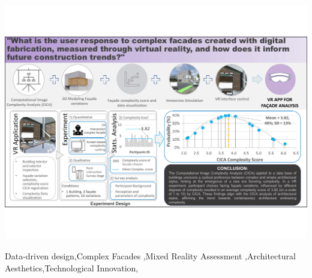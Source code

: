 \documentclass[final,5p,times]{elsarticle}
\begin{document}
\begin{frontmatter}
\begin{graphicalabstract}
    \centering
    \includegraphics[width= \textwidth, trim = 0 80 0 80, clip]{Images/GraphicAbstract}
    \label{fig:graphic_abstract}
\end{graphicalabstract}

\begin{highlights}

\end{highlights}

\begin{keyword}
Data-driven design\sep Complex Facades \sep Mixed Reality Assessment \sep Architectural Aesthetics\sep Technological Innovation\sep

\end{keyword}

\end{frontmatter}
%
\end{document}
